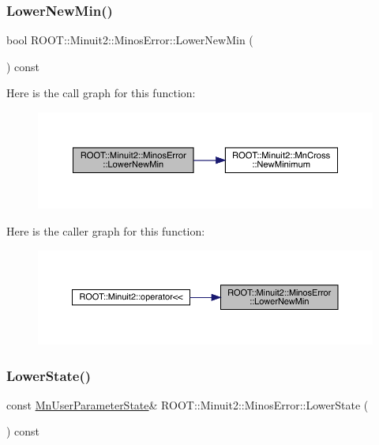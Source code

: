 \subsubsection{\texorpdfstring{LowerNewMin()}{LowerNewMin()}\hspace{0.1cm}{\footnotesize\ttfamily [2/2]}}
{\footnotesize\ttfamily bool R\+O\+O\+T\+::\+Minuit2\+::\+Minos\+Error\+::\+Lower\+New\+Min (\begin{DoxyParamCaption}{ }\end{DoxyParamCaption}) const\hspace{0.3cm}{\ttfamily [inline]}}

Here is the call graph for this function\+:
\nopagebreak
\begin{figure}[H]
\begin{center}
\leavevmode
\includegraphics[width=350pt]{d2/dd1/classROOT_1_1Minuit2_1_1MinosError_a9a806056992d1acb26420bf4895b46e9_cgraph}
\end{center}
\end{figure}
Here is the caller graph for this function\+:\nopagebreak
\begin{figure}[H]
\begin{center}
\leavevmode
\includegraphics[width=350pt]{d2/dd1/classROOT_1_1Minuit2_1_1MinosError_a9a806056992d1acb26420bf4895b46e9_icgraph}
\end{center}
\end{figure}
\mbox{\label{classROOT_1_1Minuit2_1_1MinosError_ac10a407a1cb13f4e0c1b4d21383d15df}} 
\subsubsection{\texorpdfstring{LowerState()}{LowerState()}\hspace{0.1cm}{\footnotesize\ttfamily [1/2]}}
{\footnotesize\ttfamily const \mbox{\hyperlink{classROOT_1_1Minuit2_1_1MnUserParameterState}{Mn\+User\+Parameter\+State}}\& R\+O\+O\+T\+::\+Minuit2\+::\+Minos\+Error\+::\+Lower\+State (\begin{DoxyParamCaption}{ }\end{DoxyParamCaption}) const\hspace{0.3cm}{\ttfamily [inline]}}

